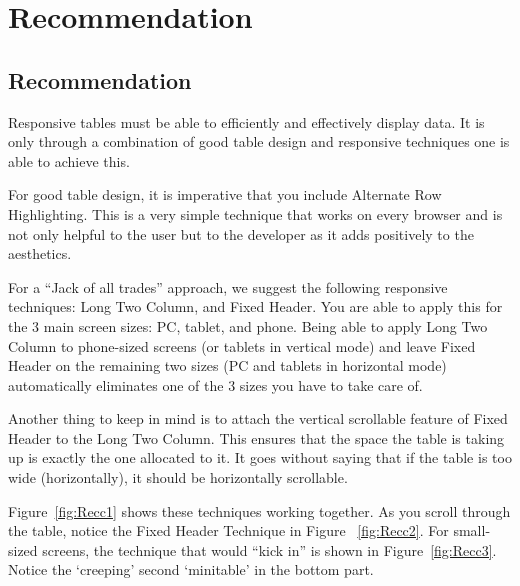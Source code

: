 %
%
%
%
%

\chapter{Recommendation}
\label{chap:Recommendation}
 


\section{Recommendation}

Responsive tables must be able to efficiently and effectively display
data. It is only through a combination of good table design and
responsive techniques one is able to achieve this. 

For good table design, it is imperative that you include Alternate Row
Highlighting. This is a very simple technique that works on every
browser and is not only helpful to the user but to the developer as it
adds positively to the aesthetics. 

For a ``Jack of all trades'' approach, we suggest the following
responsive techniques: Long Two Column, and Fixed Header. You are able
to apply this for the 3 main screen sizes: PC, tablet, and phone.
Being able to apply Long Two Column to phone-sized screens (or tablets
in vertical mode) and leave Fixed Header on the remaining two sizes
(PC and tablets in horizontal mode) automatically eliminates one of
the 3 sizes you have to take care of. 

Another thing to keep in mind is to attach the vertical scrollable
feature of Fixed Header to the Long Two Column. This ensures that the
space the table is taking up is exactly the one allocated to it. It
goes without saying that if the table is too wide (horizontally), it
should be horizontally scrollable.

Figure~\ref{fig:Recc1} shows these techniques working together. As you 
scroll through the table, notice the Fixed Header Technique in Figure 
~\ref{fig:Recc2}. For small-sized screens, the technique that would ``kick 
in'' is shown in Figure~\ref{fig:Recc3}. Notice the `creeping' second 
`minitable' in the bottom part.

